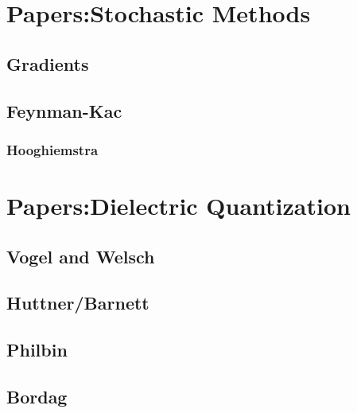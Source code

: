 \section{Papers:Stochastic Methods}

\subsection{Gradients}

\subsection{Feynman-Kac}

\subsubsection{Hooghiemstra}



\section{Papers:Dielectric Quantization}



\subsection{Vogel and Welsch}


\cite{Raabe2006}
\cite{Raabe2007}

\subsection{Huttner/Barnett}

\cite{Glauber1991}

\cite{Huttner1992}

\cite{Matloob1995}
\cite{Matloob1996}


\subsection{Philbin}

\cite{Philbin2010}
\cite{Philbin2011}

\cite{Drummond2014}

\subsection{Bordag}
\cite{Bordag1998} \cite{Bordag1999}

